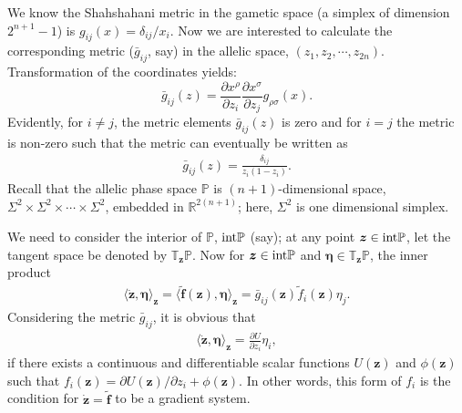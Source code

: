 \documentclass[
 pre,
 aps,
 a4paper,
 english,
 showkeys,
 reprint,
 twocolumn,
 superscriptaddress
]{revtex4}
\begin{document}
We know the Shahshahani metric in the gametic space (a simplex of dimension $2^{n+1}-1$) is $g_{ij}(x)={\delta_{ij}}/{x_{i}}$. {\color{black}Now we are interested to calculate the corresponding metric ($\bar{g}_{ij}$, say) in the allelic space, $(z_{1}, z_{2},\cdots,z_{2n})$. Transformation of the coordinates yields:
\begin{equation}\label{37}
\bar{g}_{ij}(z)=\frac{\partial x^{\rho}}{\partial z_{i}}\frac{\partial x^{\sigma}}{\partial z_{j}}g_{\rho \sigma}(x).
\end{equation}}
Evidently, for $i\ne j$, the metric elements $\bar{g}_{ij}(z)$ is zero and for $i=j$ the metric is non-zero such that the metric can eventually be written as
\begin{subequations}
	\begin{eqnarray}
	\bar{g}_{ij}(z)=\frac{\delta_{ij}}{z_{i}(1-z_{i})}.
	\end{eqnarray}
\end{subequations}
Recall that the allelic phase space $\mathbb{P}$ is $(n+1)$-dimensional space, ${\Sigma}^2\times\Sigma^2\times \cdots\times \Sigma^2$, embedded in $\mathbb{R}^{2(n+1)}$; here, $\Sigma^2$ is one dimensional simplex.

We need to consider the interior of $\mathbb{P}$, ${\rm int}\mathbb{P}$ (say); at any point ${\boldsymbol{z}}\in {\rm int}\mathbb{P}$, let the tangent space be denoted by $\mathbb{T}_{\boldsymbol{z}}\mathbb{P}$.  Now for ${\boldsymbol{z}}\in {\rm int}\mathbb{P}$ and $\boldsymbol{\eta}\in \mathbb{T}_{\boldsymbol{z}}\mathbb{P}$, the inner product 
\begin{eqnarray}
\langle\dot{\boldsymbol{z}}, \boldsymbol{\eta} \rangle_{\boldsymbol{z}}=\langle\boldsymbol{\tilde{f}}(\boldsymbol{z}), \boldsymbol{\eta} \rangle_{\boldsymbol{z}}=\bar{g}_{ij}(\boldsymbol{z})\tilde{f}_i(\boldsymbol{z}) \eta_j.
\end{eqnarray}
Considering the metric $\bar{g}_{ij}$, it is obvious that
 \begin{eqnarray}\label{eq:dotz,}
 \langle\dot{\boldsymbol{z}}, \boldsymbol{\eta} \rangle_{\boldsymbol{z}}=\frac{\partial U}{\partial z_i}\eta_i,
 \end{eqnarray}
 if there exists a continuous and differentiable scalar functions $U({\boldsymbol{z}})$ and $\phi(\boldsymbol{z})$ such that $f_i(\boldsymbol{z})={\partial U({\boldsymbol{z}})}/{\partial z_i}+\phi(\boldsymbol{z})$. In other words, this form of $f_i$ is the condition for $\dot{\boldsymbol{z}}=\tilde{\boldsymbol f}$ to be a gradient system.
 
\end{document}
